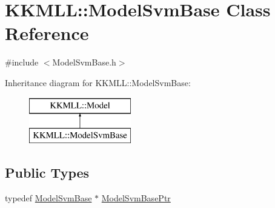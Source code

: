 \hypertarget{class_k_k_m_l_l_1_1_model_svm_base}{}\section{K\+K\+M\+LL\+:\+:Model\+Svm\+Base Class Reference}
\label{class_k_k_m_l_l_1_1_model_svm_base}


{\ttfamily \#include $<$Model\+Svm\+Base.\+h$>$}

Inheritance diagram for K\+K\+M\+LL\+:\+:Model\+Svm\+Base\+:\begin{figure}[H]
\begin{center}
\leavevmode
\includegraphics[height=2.000000cm]{class_k_k_m_l_l_1_1_model_svm_base}
\end{center}
\end{figure}
\subsection*{Public Types}
\begin{DoxyCompactItemize}
\item 
typedef \hyperlink{class_k_k_m_l_l_1_1_model_svm_base}{Model\+Svm\+Base} $\ast$ \hyperlink{class_k_k_m_l_l_1_1_model_svm_base_aa84f0e9baebb7df8a61acf1cf41a4461}{Model\+Svm\+Base\+Ptr}
\end{DoxyCompactItemize}
